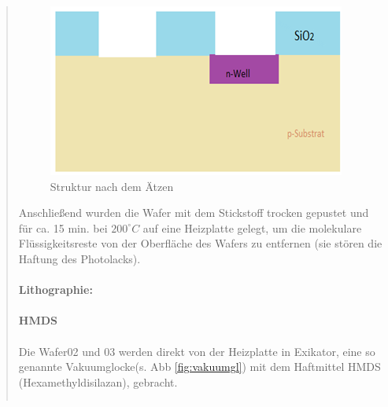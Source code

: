 \begin{quote}
    		\begin{figure}[H]
				\hspace{3.5 cm}
                  \includegraphics[scale=0.9, trim = 0cm 0cm 0cm 0cm,clip]
                	{./HerstellungBilder/KontaktfenstergeaetztundLackentfernt.png}
                  \caption{Struktur nach dem Ätzen}
                \label{fig:nachAetzen1}
            \end{figure}

    		\vspace{2em}

    		Anschließend wurden die Wafer mit dem Stickstoff trocken gepustet
    		und für ca. 15 min. bei $200^{\circ}C$ auf eine Heizplatte gelegt,
    		um die molekulare Flüssigkeitsreste von der Oberfläche des Wafers zu
    		entfernen (sie stören die Haftung des Photolacks).\\
			\\
    		\textbf{Lithographie:}\\
			\\
			\textbf{HMDS}\\
			\\
			Die Wafer02 und 03 werden direkt von der Heizplatte in Exikator,
			eine so genannte Vakuumglocke(s. Abb \ref{fig:vakuumgl}) mit dem  Haftmittel HMDS
			(Hexamethyldisilazan), gebracht.

            \vspace{2em}

    		\begin{center}
                \begin{tabular}{ll}


\end{tabular}
\end{center}
\end{quote}
